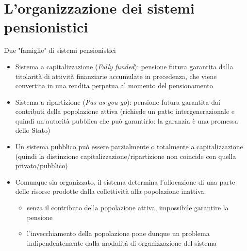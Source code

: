 \documentclass[11pt]{beamer}
\begin{document}
\section{L'organizzazione dei sistemi pensionistici}
\begin{frame}{Due "famiglie" di sistemi pensionistici}
\begin{itemize}
\item \alert{Sistema a capitalizzazione} (\emph{Fully funded}): pensione futura garantita
dalla titolarità di attività finanziarie accumulate in precedenza, che viene
convertita in una rendita perpetua al momento del pensionamento
\item \alert{Sistema a ripartizione} (\emph{Pas-as-you-go}): pensione futura garantita dai
contributi della popolazione attiva (richiede un patto intergenerazionale e
quindi un'autorità pubblica che può garantirlo: la garanzia è una promessa
dello Stato)
\item Un sistema pubblico può essere parzialmente o totalmente a capitalizzazione
(quindi la distinzione capitalizzazione/ripartizione non coincide con quella
privato/pubblico)
\item Comunque sia organizzato, il sistema determina l'allocazione di una parte
delle risorse prodotte dalla collettività alla popolazione
inattiva:
\begin{itemize}
\item senza il contributo della popolazione attiva, impossibile garantire la
pensione
\item l'invecchiamento della popolazione pone dunque un problema
indipendentemente dalla modalità di organizzazione del sistema
\end{itemize}
\end{itemize}
\end{frame}
\end{document}
